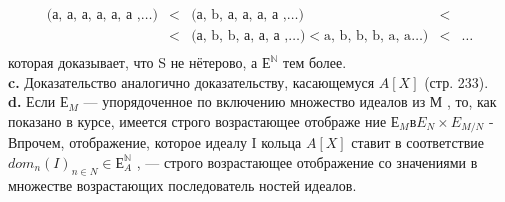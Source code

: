 			$$\begin{array}{ccccc}
						\text{(а, а, а, а, а, а ,}\ldots) & < & \text{(а, b, а, а, а, а ,}\ldots) & < & \\
																				 & < & \text{(а, b, b, а, а, а ,}\ldots) < \text{a, b, b, b, a, a}\ldots) & < & \ldots \\
			\end{array}$$
которая доказывает, что S не нётерово, а $Е^{\mathbb{N}}$ тем более.\\
\hspace*{15pt}\textbf{c.} Доказательство аналогично доказательству, касающемуся $A[X]$\linebreak
(стр. 233).\\
\hspace*{15pt}\textbf{d.} Если $Е_M$ — упорядоченное по включению множество идеалов из\linebreak
М , то, как показано в курсе, имеется строго возрастающее отображе­\linebreak
ние $Е_M в E_N \times E_{M/N}$ - Впрочем, отображение, которое идеалу I кольца\linebreak
$A[X]$ ставит в соответствие $dom_n(I)_{n \in N} \in Е^{\mathbb{N}}_A$ , — строго возрастающее\linebreak
отображение со значениями в множестве возрастающих последователь­\linebreak
ностей идеалов.

